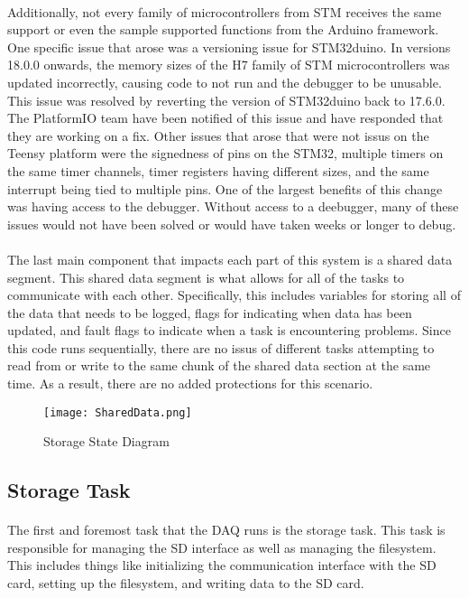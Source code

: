 \paragraph{}
Additionally, not every family of microcontrollers from STM receives the same support or even the sample supported functions from the Arduino framework.
One specific issue that arose was a versioning issue for STM32duino.
In versions 18.0.0 onwards, the memory sizes of the H7 family of STM microcontrollers was updated incorrectly, causing code to not run and the debugger to be unusable.
This issue was resolved by reverting the version of STM32duino back to 17.6.0.
The PlatformIO team have been notified of this issue and have responded that they are working on a fix.
Other issues that arose that were not issus on the Teensy platform were the signedness of pins on the STM32, multiple timers on the same timer channels, timer registers having different sizes, and the same interrupt being tied to multiple pins.
One of the largest benefits of this change was having access to the debugger.
Without access to a deebugger, many of these issues would not have been solved or would have taken weeks or longer to debug.

\paragraph{}
The last main component that impacts each part of this system is a shared data segment.
This shared data segment is what allows for all of the tasks to communicate with each other.
Specifically, this includes variables for storing all of the data that needs to be logged, flags for indicating when data has been updated, and fault flags to indicate when a task is encountering problems.
Since this code runs sequentially, there are no issus of different tasks attempting to read from or write to the same chunk of the shared data section at the same time.
As a result, there are no added protections for this scenario.

\begin{figure}[H]
	\centering
	\texttt{[image: SharedData.png]}
	\caption{Storage State Diagram}
	\label{fig:StorageDiagram}
\end{figure}

\subsection{Storage Task}

\paragraph{}
The first and foremost task that the DAQ runs is the storage task.
This task is responsible for managing the SD interface as well as managing the filesystem.
This includes things like initializing the communication interface with the SD card, setting up the filesystem, and writing data to the SD card.

